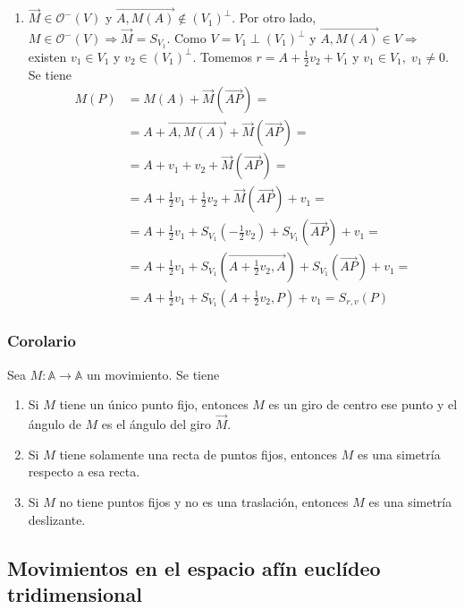 \documentclass[12pt, a4paper, ones, notitlepage, openany,titlepage]{article}
\begin{document}
\begin{enumerate}[label=(\arabic*)]
	\item $\overrightarrow{M} \in \mathcal{O}^-(V)$ y $\overrightarrow{A,M(A)} \notin (V_1)^\perp$. Por otro lado, $M \in \mathcal{O}^-(V) \Longrightarrow \overrightarrow{M} = S_{V_1}$. Como $V = V_1 \perp (V_1)^\perp$ y $\overrightarrow{A,M(A)} \in V \Longrightarrow$ existen $v_1 \in V_1$ y $v_2 \in (V_1)^\perp$. Tomemos $r = A + \frac{1}{2}v_2 + V_1$ y $v_1 \in V_1, \; v_1 \neq 0$. Se tiene
	$$
	\begin{aligned}
		M(P) & = M(A) + \overrightarrow{M}(\overrightarrow{AP}) = \\
		& = A + \overrightarrow{A,M(A)} + \overrightarrow{M}(\overrightarrow{AP}) = \\
		& = A + v_1 + v_2 + \overrightarrow{M}(\overrightarrow{AP}) = \\
		& = A + \frac{1}{2}v_1 + \frac{1}{2}v_2 + \overrightarrow{M}(\overrightarrow{AP}) + v_1 = \\
		& = A + \frac{1}{2}v_1 + S_{V_1}\left(-\frac{1}{2}v_2\right) + S_{V_1}\left(\overrightarrow{AP}\right) + v_1 = \\
		& = A + \frac{1}{2}v_1 + S_{V_1}\left(\overrightarrow{A + \frac{1}{2}v_2,A}\right) + S_{V_1}\left(\overrightarrow{AP}\right) + v_1 = \\
		& = A + \frac{1}{2}v_1 + S_{V_1}\left(A + \frac{1}{2}v_2,P\right) + v_1 = S_{r,v}(P)
	\end{aligned}
	$$
\end{enumerate}

\subsubsection{Corolario}
\noindent Sea $M: \mathbb{A} \rightarrow \mathbb{A}$ un movimiento. Se tiene
\begin{enumerate}[label=(\arabic*)]
\item Si $M$ tiene un único punto fijo, entonces $M$ es un giro de centro ese punto y el ángulo de $M$ es el ángulo del giro $\overrightarrow{M}$.

\item Si $M$ tiene solamente una recta de puntos fijos, entonces $M$ es una simetría respecto a esa recta.

\item Si $M$ no tiene puntos fijos y no es una traslación, entonces $M$ es una simetría deslizante.
\end{enumerate}

\subsection{Movimientos en el espacio afín euclídeo tridimensional}
\end{document}

